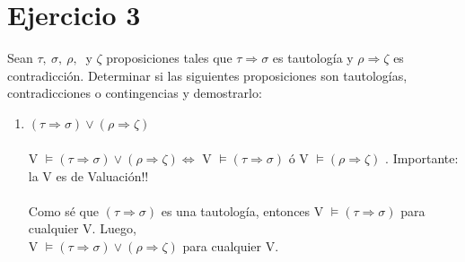 \documentclass{article}
\begin{document}
\section*{Ejercicio 3}{Sean $\tau, \ \sigma, \ \rho, \ $ y $\zeta$ proposiciones tales que $\tau \Rightarrow \sigma$ es tautología y $\rho \Rightarrow \zeta$ es contradicción. Determinar si las siguientes proposiciones son tautologías, contradicciones o contingencias y demostrarlo:}
\begin{enumerate}[label=\roman*.,font=\itshape]
\item{$(\tau \Rightarrow \sigma) \lor (\rho \Rightarrow \zeta)$}
\\
\\
{V $\vDash (\tau \Rightarrow \sigma) \lor (\rho \Rightarrow \zeta) \iff $ V $\vDash (\tau \Rightarrow \sigma)$ ó V $\vDash (\rho \Rightarrow \zeta)$ . Importante: la V es de Valuación!!}
\\
\\
{Como sé que $(\tau \Rightarrow \sigma)$ es una tautología, entonces V $\vDash (\tau \Rightarrow \sigma)$ para cualquier V. Luego,\\ V $\vDash (\tau \Rightarrow \sigma) \lor (\rho \Rightarrow \zeta) $ para cualquier V.}
\end{enumerate}
\end{document}
